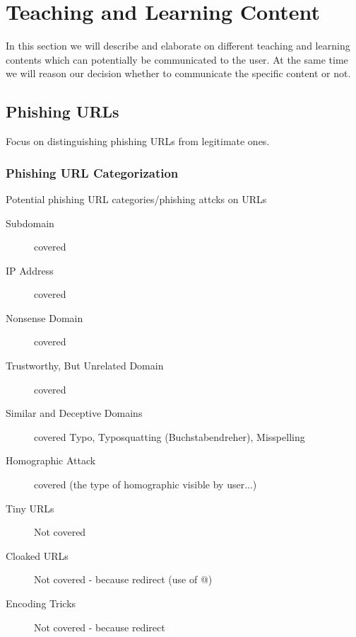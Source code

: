 \section{Teaching and Learning Content}
In this section we will describe and elaborate on different teaching and learning contents which can potentially be communicated to the user. At the same time we will reason our decision whether to communicate the specific content or not.
\subsection{Phishing URLs}
Focus on distinguishing phishing URLs from legitimate ones.

\subsubsection{Phishing URL Categorization}

Potential phishing URL categories/phishing attcks on URLs
\begin{description}
	\item[Subdomain] covered
	\item[IP Address] covered
	\item[Nonsense Domain] covered
	\item[Trustworthy, But Unrelated Domain] covered
	\item[Similar and Deceptive Domains] covered Typo, Typosquatting (Buchstabendreher), Misspelling
	\item[Homographic Attack] covered (the type of homographic visible by user...)
	\item[Tiny URLs] Not covered
	\item[Cloaked URLs] Not covered - because redirect (use of @)
	\item[Encoding Tricks] Not covered - because redirect
\end{description}

